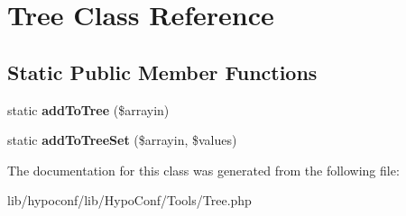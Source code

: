 \hypertarget{class_tools_1_1_tree}{
\section{\-Tree \-Class \-Reference}
\label{class_tools_1_1_tree}
}
\subsection*{\-Static \-Public \-Member \-Functions}
\begin{DoxyCompactItemize}
\item 
\hypertarget{class_tools_1_1_tree_a0cff2288ced5dca1fcb6c22fb0ea386d}{
static {\bfseries add\-To\-Tree} (\$arrayin)}
\label{class_tools_1_1_tree_a0cff2288ced5dca1fcb6c22fb0ea386d}

\item 
\hypertarget{class_tools_1_1_tree_a55079e1050bac003e05dfc0b90884946}{
static {\bfseries add\-To\-Tree\-Set} (\$arrayin, \$values)}
\label{class_tools_1_1_tree_a55079e1050bac003e05dfc0b90884946}

\end{DoxyCompactItemize}


\-The documentation for this class was generated from the following file\-:\begin{DoxyCompactItemize}
\item 
lib/hypoconf/lib/\-Hypo\-Conf/\-Tools/\-Tree.\-php\end{DoxyCompactItemize}
